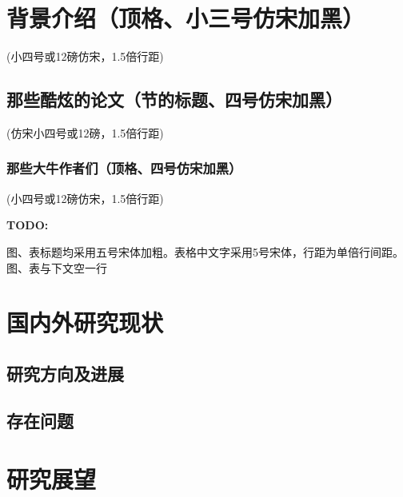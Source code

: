 \section{背景介绍（顶格、小三号仿宋加黑）}
(小四号或12磅仿宋，1.5倍行距)

\subsection{那些酷炫的论文（节的标题、四号仿宋加黑）}
(仿宋小四号或12磅，1.5倍行距)
\subsubsection{那些大牛作者们（顶格、四号仿宋加黑）}
(小四号或12磅仿宋，1.5倍行距)

{\bfseries TODO:}

图、表标题均采用五号宋体加粗。表格中文字采用5号宋体，行距为单倍行间距。图、表与下文空一行
\section{国内外研究现状}
\subsection{研究方向及进展}
\subsection{存在问题}
\section{研究展望}

\lipsum[1]

\parencite{small}

\printbibliography[heading=secbib]